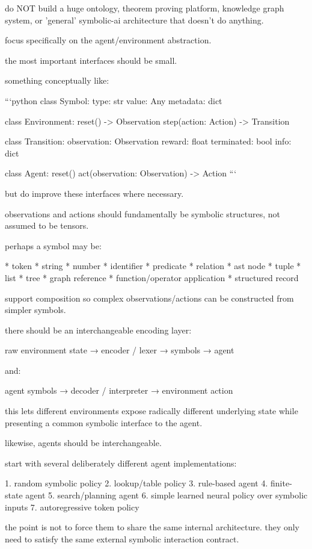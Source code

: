 do NOT build a huge ontology, theorem proving platform, knowledge graph system, or 'general' symbolic-ai architecture that doesn't do anything.

focus specifically on the agent/environment abstraction.

the most important interfaces should be small.

something conceptually like:

```python
class Symbol:
    type: str
    value: Any
    metadata: dict

class Environment:
    reset() -> Observation
    step(action: Action) -> Transition

class Transition:
    observation: Observation
    reward: float
    terminated: bool
    info: dict

class Agent:
    reset()
    act(observation: Observation) -> Action
```

but do improve these interfaces where necessary.

observations and actions should fundamentally be symbolic structures, not assumed to be tensors.

perhaps a symbol may be:

* token
* string
* number
* identifier
* predicate
* relation
* ast node
* tuple
* list
* tree
* graph reference
* function/operator application
* structured record

support composition so complex observations/actions can be constructed from simpler symbols.

there should be an interchangeable encoding layer:

raw environment state
→ encoder / lexer
→ symbols
→ agent

and:

agent symbols
→ decoder / interpreter
→ environment action

this lets different environments expose radically different underlying state while presenting a common symbolic interface to the agent.

likewise, agents should be interchangeable.

start with several deliberately different agent implementations:

1. random symbolic policy
2. lookup/table policy
3. rule-based agent
4. finite-state agent
5. search/planning agent
6. simple learned neural policy over symbolic inputs
7. autoregressive token policy

the point is not to force them to share the same internal architecture. they only need to satisfy the same external symbolic interaction contract.

